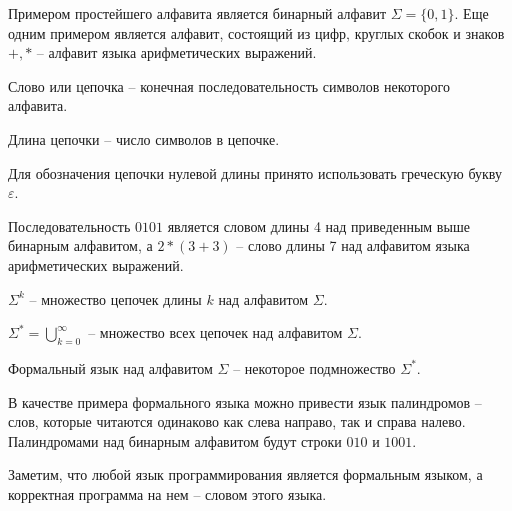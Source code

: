 Примером простейшего алфавита является бинарный алфавит $\Sigma = \{0, 1\}$.
Еще одним примером является алфавит, состоящий из цифр, круглых скобок и знаков $+, *$ -- алфавит языка арифметических выражений.
\begin{definition}
Слово или цепочка -- конечная последовательность символов некоторого алфавита.
\end{definition}
\begin{definition}
Длина цепочки -- число символов в цепочке.
\end{definition}
Для обозначения цепочки нулевой длины принято использовать греческую букву $\varepsilon$.

Последовательность $0101$ является словом длины 4 над приведенным выше бинарным алфавитом,
а $2 * (3 + 3)$ -- слово длины 7 над алфавитом языка арифметических выражений.
\begin{definition}
$\Sigma^k$ -- множество цепочек длины $k$ над алфавитом $\Sigma$.
\end{definition}
\begin{definition}
$\Sigma^* = \bigcup\limits_{k=0}^\infty$ -- множество всех цепочек над алфавитом $\Sigma$.
\end{definition}
\begin{definition}
Формальный язык над алфавитом $\Sigma$ -- некоторое подмножество $\Sigma^*$.
\end{definition}
В качестве примера формального языка можно привести язык палиндромов -- слов, которые читаются одинаково как слева направо, так и справа налево.
Палиндромами над бинарным алфавитом будут строки $010$ и $1001$.

Заметим, что любой язык программирования является формальным языком, а корректная программа на нем -- словом этого языка.
